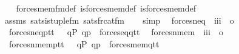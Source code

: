 \begin{isabellebody}
%
\isadelimproof
\ \ %
\endisadelimproof
%
\isatagproof
{}\isamarkupfalse%
\ forces{\isacharunderscore}{\kern0pt}mem{\isacharunderscore}{\kern0pt}fm{\isacharunderscore}{\kern0pt}def\ is{\isacharunderscore}{\kern0pt}forces{\isacharunderscore}{\kern0pt}mem{\isacharunderscore}{\kern0pt}def\ is{\isacharunderscore}{\kern0pt}forces{\isacharunderscore}{\kern0pt}mem{\isacharprime}{\kern0pt}{\isacharunderscore}{\kern0pt}def\isanewline
\ \ \isamarkupfalse%
\ assms\ sats{\isacharunderscore}{\kern0pt}is{\isacharunderscore}{\kern0pt}tuple{\isacharunderscore}{\kern0pt}fm\ sats{\isacharunderscore}{\kern0pt}frc{\isacharunderscore}{\kern0pt}at{\isacharunderscore}{\kern0pt}fm\isanewline
\ \ \isamarkupfalse%
\ simp%
\endisatagproof
{\isafoldproof}%
%
\isadelimproof
\isanewline
%
\endisadelimproof
\isanewline
\isanewline
{}\isamarkupfalse%
\isanewline
\ \ forces{\isacharunderscore}{\kern0pt}neq\ {\isacharcolon}{\kern0pt}{\isacharcolon}{\kern0pt}\ {\isachardoublequoteopen}{\isacharbrackleft}{\kern0pt}i{\isacharcomma}{\kern0pt}i{\isacharcomma}{\kern0pt}i{\isacharbrackright}{\kern0pt}\ {\isasymRightarrow}\ o{\isachardoublequoteclose}\ \isanewline
\ \ {\isachardoublequoteopen}forces{\isacharunderscore}{\kern0pt}neq{\isacharparenleft}{\kern0pt}p{\isacharcomma}{\kern0pt}t{}{\isacharcomma}{\kern0pt}t{}{\isacharparenright}{\kern0pt}\ {\isasymequiv}\ {\isasymnot}\ {\isacharparenleft}{\kern0pt}{\isasymexists}q{\isasymin}P{\isachardot}{\kern0pt}\ q{\isasympreceq}p\ {\isasymand}\ forces{\isacharunderscore}{\kern0pt}eq{\isacharparenleft}{\kern0pt}q{\isacharcomma}{\kern0pt}t{}{\isacharcomma}{\kern0pt}t{}{\isacharparenright}{\kern0pt}{\isacharparenright}{\kern0pt}{\isachardoublequoteclose}\isanewline
\isanewline
{}\isamarkupfalse%
\isanewline
\ \ forces{\isacharunderscore}{\kern0pt}nmem\ {\isacharcolon}{\kern0pt}{\isacharcolon}{\kern0pt}\ {\isachardoublequoteopen}{\isacharbrackleft}{\kern0pt}i{\isacharcomma}{\kern0pt}i{\isacharcomma}{\kern0pt}i{\isacharbrackright}{\kern0pt}\ {\isasymRightarrow}\ o{\isachardoublequoteclose}\ \isanewline
\ \ {\isachardoublequoteopen}forces{\isacharunderscore}{\kern0pt}nmem{\isacharparenleft}{\kern0pt}p{\isacharcomma}{\kern0pt}t{}{\isacharcomma}{\kern0pt}t{}{\isacharparenright}{\kern0pt}\ {\isasymequiv}\ {\isasymnot}\ {\isacharparenleft}{\kern0pt}{\isasymexists}q{\isasymin}P{\isachardot}{\kern0pt}\ q{\isasympreceq}p\ {\isasymand}\ forces{\isacharunderscore}{\kern0pt}mem{\isacharparenleft}{\kern0pt}q{\isacharcomma}{\kern0pt}t{}{\isacharcomma}{\kern0pt}t{}{\isacharparenright}{\kern0pt}{\isacharparenright}{\kern0pt}{\isachardoublequoteclose}\isanewline

\end{isabellebody}
